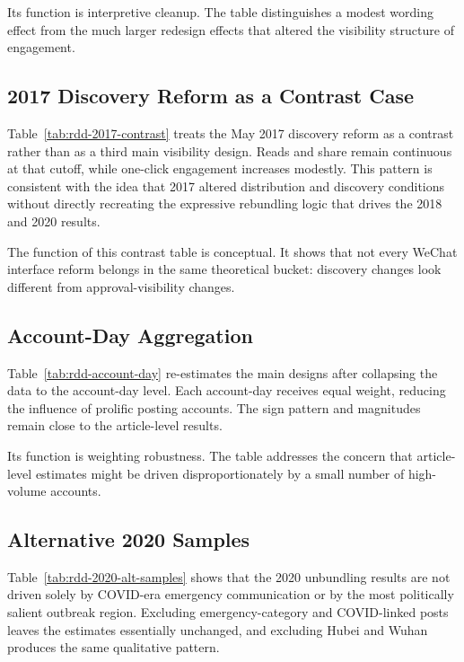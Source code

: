 \documentclass[12pt, american]{article}
\begin{document}
Its function is interpretive cleanup. The table distinguishes a modest wording effect from the much larger redesign effects that altered the visibility structure of engagement.



\subsection{2017 Discovery Reform as a Contrast Case}

Table~\ref{tab:rdd-2017-contrast} treats the May 2017 discovery reform as a contrast rather than as a third main visibility design. Reads and share remain continuous at that cutoff, while one-click engagement increases modestly. This pattern is consistent with the idea that 2017 altered distribution and discovery conditions without directly recreating the expressive rebundling logic that drives the 2018 and 2020 results.

The function of this contrast table is conceptual. It shows that not every WeChat interface reform belongs in the same theoretical bucket: discovery changes look different from approval-visibility changes.



\subsection{Account-Day Aggregation}

Table~\ref{tab:rdd-account-day} re-estimates the main designs after collapsing the data to the account-day level. Each account-day receives equal weight, reducing the influence of prolific posting accounts. The sign pattern and magnitudes remain close to the article-level results.

Its function is weighting robustness. The table addresses the concern that article-level estimates might be driven disproportionately by a small number of high-volume accounts.



\subsection{Alternative 2020 Samples}

Table~\ref{tab:rdd-2020-alt-samples} shows that the 2020 unbundling results are not driven solely by COVID-era emergency communication or by the most politically salient outbreak region. Excluding emergency-category and COVID-linked posts leaves the estimates essentially unchanged, and excluding Hubei and Wuhan produces the same qualitative pattern.
\end{document}
